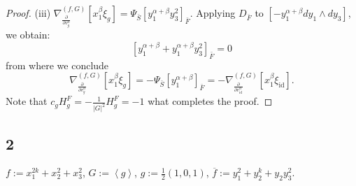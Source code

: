 \documentclass[reqno,12pt]{amsart}
\numberwithin{equation}{section}
\theoremstyle{plain}
\theoremstyle{definition}
\newcommand{\CC}{{\mathbb{C}}}
\newcommand{\Jac}{\mathrm{Jac}}
\newcommand{\id}{\mathrm{id}}
\def\T{{\mathcal T}}
\numberwithin{equation}{section}
\begin{document}
\begin{proof}
(iii) $\nabla_{\frac{\partial}{\partial v^\alpha_{g}}}^{(f,G)}[x_1^\beta\xi_{g}] = \Psi_{\bar{S}}[y_1^{\alpha+\beta}y_3^2]_{\bar{F}}$.
Applying $D_{\bar{F}}$ to $[-y_1^{\alpha+\beta}dy_1\wedge dy_3]$, we obtain:
\[
[y_1^{\alpha+\beta} + y_1^{\alpha+\beta}y_3^2]_{\bar{F}} = 0
\]
from where we conclude
\[
\nabla_{\frac{\partial}{\partial v^\alpha_{g}}}^{(f,G)}[x_1^\beta\xi_{g}] = - \Psi_{\bar{S}}[y_1^{\alpha+\beta}]_{\bar{F}} = -\nabla_{\frac{\partial}{\partial v^\alpha_{\id}}}^{(f,G)}[x_1^{\beta}\xi_{\id}].
\]
Note that $c_gH_{g}^F = -\frac{1}{|G|^2}H_{g}^F = -1$ what completes the proof.
\end{proof}

\subsection*{2}
$f:=x_1^{2k}+x_2^2+x_3^2$, $G:=\left<g\right>$, $g:=\frac{1}{2}(1,0,1)$, $\overline{f}:=y_1^2+y_2^k+y_2y_3^2$.
% 
\end{document}
